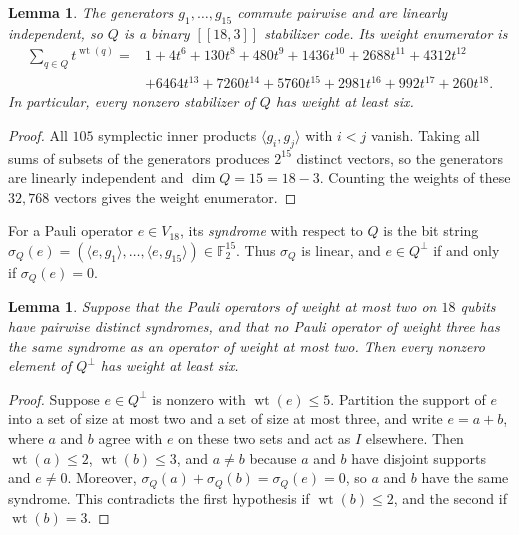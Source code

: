 \documentclass[11pt]{article}
\newtheorem{lemma}[theorem]{Lemma}
\theoremstyle{definition}
\theoremstyle{remark}
\newcommand{\F}{\mathbb F_2}
\newcommand{\qc}[1]{[\![#1]\!]}
\newcommand{\wt}{\operatorname{wt}}
\begin{document}
\begin{lemma}\label{lem:Qrank}
The generators \(g_1,\ldots,g_{15}\) commute pairwise and are linearly
independent, so \(Q\) is a binary \(\qc{18,3}\) stabilizer code. Its
weight enumerator is
\[
 \begin{aligned}
 \sum_{q\in Q}t^{\wt(q)}={}&1+4t^{6}+130t^{8}+480t^{9}+1436t^{10}+2688t^{11}+4312t^{12}\\
 &+6464t^{13}+7260t^{14}+5760t^{15}+2981t^{16}+992t^{17}+260t^{18}.
 \end{aligned}
\]
In particular, every nonzero stabilizer of \(Q\) has weight at least
six.
\end{lemma}
\begin{proof}
All \(105\) symplectic inner products \(\langle g_i,g_j\rangle\) with
\(i<j\) vanish. Taking all sums of subsets of the generators produces
\(2^{15}\) distinct vectors, so the generators are linearly independent
and \(\dim Q=15=18-3\). Counting the weights of these \(32{,}768\)
vectors gives the weight enumerator.
\end{proof}

For a Pauli operator \(e\in V_{18}\), its \emph{syndrome} with respect to
\(Q\) is the bit string
\(\sigma_Q(e)=(\langle e,g_1\rangle,\ldots,\langle e,g_{15}\rangle)\in\F^{15}\).
Thus \(\sigma_Q\) is linear, and \(e\in Q^\perp\) if and only if
\(\sigma_Q(e)=0\).

\begin{lemma}\label{lem:radius}
Suppose that the Pauli operators of weight at most two on \(18\) qubits
have pairwise distinct syndromes, and that no Pauli operator of weight
three has the same syndrome as an operator of weight at most two. Then
every nonzero element of \(Q^\perp\) has weight at least six.
\end{lemma}
\begin{proof}
Suppose \(e\in Q^\perp\) is nonzero with \(\wt(e)\leq5\). Partition the
support of \(e\) into a set of size at most two and a set of size at
most three, and write \(e=a+b\), where \(a\) and \(b\) agree with \(e\)
on these two sets and act as \(I\) elsewhere. Then \(\wt(a)\leq2\),
\(\wt(b)\leq3\), and \(a\neq b\) because \(a\) and \(b\) have disjoint
supports and \(e\neq0\). Moreover,
\(\sigma_Q(a)+\sigma_Q(b)=\sigma_Q(e)=0\), so \(a\) and \(b\) have the
same syndrome. This contradicts the first hypothesis if \(\wt(b)\leq2\),
and the second if \(\wt(b)=3\).
\end{proof}
\end{document}
